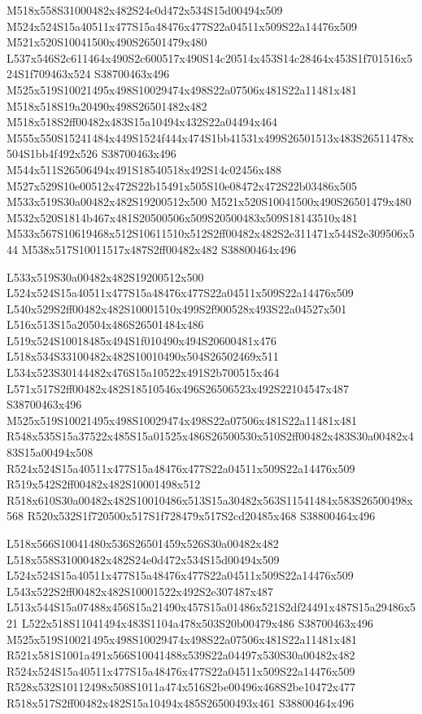 \documentclass{article}
\begin{document}
\begin{multicols}{2}
M518x558S31000482x482S24e0d472x534S15d00494x509 M524x524S15a40511x477S15a48476x477S22a04511x509S22a14476x509 M521x520S10041500x490S26501479x480 L537x546S2c611464x490S2c600517x490S14c20514x453S14c28464x453S1f701516x524S1f709463x524 S38700463x496 M525x519S10021495x498S10029474x498S22a07506x481S22a11481x481 M518x518S19a20490x498S26501482x482 M518x518S2ff00482x483S15a10494x432S22a04494x464 M555x550S15241484x449S1524f444x474S1bb41531x499S26501513x483S26511478x504S1bb4f492x526 S38700463x496 M544x511S26506494x491S18540518x492S14c02456x488 M527x529S10e00512x472S22b15491x505S10e08472x472S22b03486x505 M533x519S30a00482x482S19200512x500 M521x520S10041500x490S26501479x480 M532x520S1814b467x481S20500506x509S20500483x509S18143510x481 M533x567S10619468x512S10611510x512S2ff00482x482S2e311471x544S2e309506x544 M538x517S10011517x487S2ff00482x482 S38800464x496

L533x519S30a00482x482S19200512x500 L524x524S15a40511x477S15a48476x477S22a04511x509S22a14476x509 L540x529S2ff00482x482S10001510x499S2f900528x493S22a04527x501 L516x513S15a20504x486S26501484x486 L519x524S10018485x494S1f010490x494S20600481x476 L518x534S33100482x482S10010490x504S26502469x511 L534x523S30144482x476S15a10522x491S2b700515x464 L571x517S2ff00482x482S18510546x496S26506523x492S22104547x487 S38700463x496 M525x519S10021495x498S10029474x498S22a07506x481S22a11481x481 R548x535S15a37522x485S15a01525x486S26500530x510S2ff00482x483S30a00482x483S15a00494x508 R524x524S15a40511x477S15a48476x477S22a04511x509S22a14476x509 R519x542S2ff00482x482S10001498x512 R518x610S30a00482x482S10010486x513S15a30482x563S11541484x583S26500498x568 R520x532S1f720500x517S1f728479x517S2cd20485x468 S38800464x496

L518x566S10041480x536S26501459x526S30a00482x482 L518x558S31000482x482S24e0d472x534S15d00494x509 L524x524S15a40511x477S15a48476x477S22a04511x509S22a14476x509 L543x522S2ff00482x482S10001522x492S2e307487x487 L513x544S15a07488x456S15a21490x457S15a01486x521S2df24491x487S15a29486x521 L522x518S11041494x483S1104a478x503S20b00479x486 S38700463x496 M525x519S10021495x498S10029474x498S22a07506x481S22a11481x481 R521x581S1001a491x566S10041488x539S22a04497x530S30a00482x482 R524x524S15a40511x477S15a48476x477S22a04511x509S22a14476x509 R528x532S10112498x508S1011a474x516S2be00496x468S2be10472x477 R518x517S2ff00482x482S15a10494x485S26500493x461 S38800464x496


\end{multicols}
\end{document}
